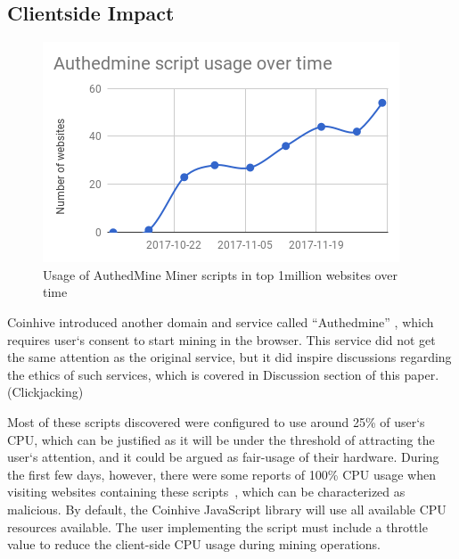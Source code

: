 \subsection{Clientside Impact}

\begin{figure}[t]
\centering
\includegraphics[width=\linewidth]{figures/usage_of_authedmine_over_time.png}
	\caption{Usage of AuthedMine Miner scripts in top 1million websites over time}
\end{figure}

Coinhive introduced another domain and service called ``Authedmine'' , which requires user`s consent to start mining in the browser. This service did not get the same attention as the original service, but it did inspire discussions regarding the ethics of such services, which is covered in Discussion section of this paper. (Clickjacking) 

Most of these scripts discovered were configured to use around 25\% of user`s CPU, which can be justified as it will be under the threshold of attracting the user`s attention, and it could be argued as fair-usage of their hardware. During the first few days, however, there were some reports of 100\% CPU usage when visiting websites containing these scripts~\cite{piratesbayblog}, which can be characterized as malicious. By default, the Coinhive JavaScript library will use all available CPU resources available. The user implementing the script must include a throttle value to reduce the client-side CPU usage during mining operations.

